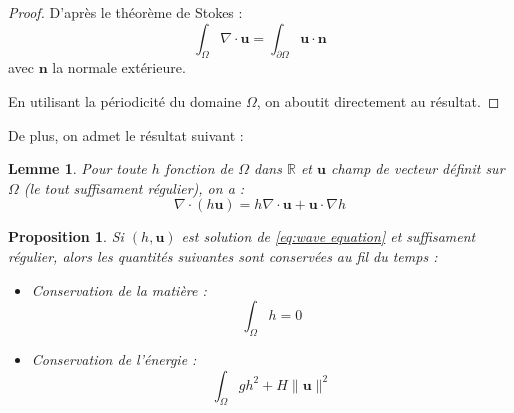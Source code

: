 \documentclass[10pt,a4paper]{article}
\newtheorem{lemme}{Lemme}
\newtheorem{proposition}{Proposition}
\def\gint{\displaystyle\int}
\begin{document}
\begin{proof}
D'après le théorème de Stokes :
$$\gint_{\Omega} \nabla \cdot \mathbf{u} = \gint_{\partial \Omega} \mathbf{u} \cdot \mathbf{n}$$
avec $\mathbf{n}$ la normale extérieure.

En utilisant la périodicité du domaine $\Omega$, on aboutit directement au résultat.
\end{proof}

De plus, on admet le résultat suivant :

\begin{lemme}
Pour toute $h$ fonction de $\Omega$ dans $\mathbb{R}$ et $\mathbf{u}$ champ de vecteur définit sur $\Omega$ (le tout suffisament régulier), on a :
\begin{equation}
\nabla \cdot \left( h \mathbf{u} \right) = h \nabla \cdot \mathbf{u} + \mathbf{u} \cdot \nabla h 
\end{equation}
\label{lem:ipp}
\end{lemme}

\begin{proposition}
Si $(h, \mathbf{u})$ est solution de \eqref{eq:wave equation} et suffisament régulier, alors les quantités suivantes sont conservées au fil du temps :
\begin{itemize}
\item \textit{Conservation de la matière : }
\begin{equation}
\gint_{\Omega} h = 0
\end{equation}
\item \textit{Conservation de l'énergie : }
\begin{equation}
\gint_{\Omega} g h^2 + H \|\mathbf{u}\|^2
\end{equation}
\end{itemize}
\end{proposition}
\end{document}
